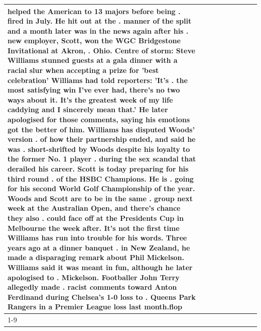 \begin{table}[H]
\begin{tabular}{lllrlllll}
helped the American to 13 majors before being . fired in July. He hit out at the . manner of the split and a month later was in the news again after his . new employer, Scott, won the WGC Bridgestone Invitational at Akron, . Ohio. Centre of storm: Steve Williams stunned guests at a gala dinner with a racial slur when accepting a prize for 'best celebration' Williams had told reporters: 'It's . the most satisfying win I've ever had, there's no two ways about it. It's the greatest week of my life caddying and I sincerely mean that.' He later apologised for those comments, saying his emotions got the better of him. Williams has disputed Woods' version . of how their partnership ended, and said he was . short-shrifted by Woods despite his loyalty to the former No. 1 player . during the sex scandal that derailed his career. Scott is today preparing for his third round . of the HSBC Champions. He is . going for his second World Golf Championship of the year. Woods and Scott are to be in the same . group next week at the Australian Open, and there's chance they also . could face off at the Presidents Cup in Melbourne the week after. It's not the first time Williams has run into trouble for his words. Three years ago at a dinner banquet . in New Zealand, he made a disparaging remark about Phil Mickelson. Williams said it was meant in fun, although he later apologised to . Mickelson. Footballer John Terry allegedly made . racist comments toward Anton Ferdinand during Chelsea's 1-0 loss to . Queens Park Rangers in a Premier League loss last month.flop \\
\cline{1-9}

\end{tabular}
\end{table}
